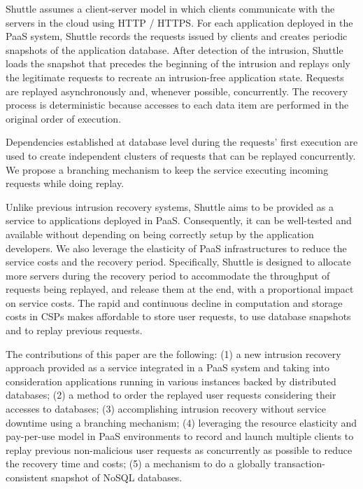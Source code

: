 \documentclass[10pt,conference]{IEEEtran}
\begin{document}
Shuttle assumes a client-server model in which clients communicate with the servers in the cloud using HTTP / HTTPS. For each application deployed in the \ac{PaaS} system, Shuttle records the requests issued by clients and creates periodic snapshots of the application database. 
After detection of the intrusion, Shuttle loads the snapshot that precedes the beginning of the intrusion and replays only the legitimate requests to recreate an intrusion-free application state. Requests are replayed asynchronously and, whenever possible, concurrently. The recovery process is deterministic because accesses to each data item are performed in the original order of execution.

Dependencies established at database level during the requests' first execution are used to create independent clusters of requests that can be replayed concurrently. We propose a branching mechanism to keep the service executing incoming requests while doing replay.

Unlike previous intrusion recovery systems, Shuttle aims to be provided as a service to applications deployed in \ac{PaaS}. Consequently, it can be well-tested and available without depending on being correctly setup by the application developers. We also leverage the elasticity of \ac{PaaS} infrastructures to reduce the service costs and the recovery period. Specifically, Shuttle is designed to allocate more servers during the recovery period to accommodate the throughput of requests being replayed, and release them at the end, with a proportional impact on service costs. The rapid and continuous decline in computation and storage costs in CSPs makes affordable to store user requests, to use database snapshots and to replay previous requests.

The contributions of this paper are the following: 
(1) a new intrusion recovery approach provided as a service integrated in a \ac{PaaS} system and taking into consideration applications running in various instances backed by distributed databases;
(2) a method to order the replayed user requests considering their accesses to databases;
(3) accomplishing intrusion recovery without service downtime using a branching mechanism;
(4) leveraging the resource elasticity and pay-per-use model in \ac{PaaS} environments to record and launch multiple clients to replay previous non-malicious user requests as concurrently as possible to reduce the recovery time and costs;
(5) a mechanism to do a globally transaction-consistent snapshot of NoSQL databases.
\end{document}
